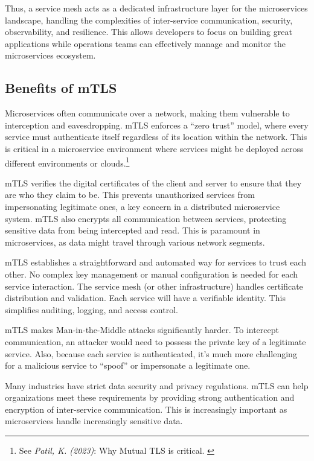 Thus, a service mesh acts as a dedicated infrastructure layer for the
microservices landscape, handling the complexities of inter-service
communication, security, observability, and resilience. This allows
developers to focus on building great applications while operations
teams can effectively manage and monitor the microservices ecosystem.

\subsection{Benefits of mTLS}

Microservices often communicate over a network, making them vulnerable
to interception and eavesdropping. mTLS enforces a ``zero trust'' model,
where every service must authenticate itself regardless of its location
within the network. This is critical in a microservice environment where
services might be deployed across different environments or clouds.\footnote{See \textit{Patil, K. (2023)}: Why Mutual TLS is critical. \cite{whyCritical}}

mTLS verifies the digital certificates of the client and server to
ensure that they are who they claim to be. This prevents unauthorized
services from impersonating legitimate ones, a key concern in a
distributed microservice system. mTLS also encrypts all communication
between services, protecting sensitive data from being intercepted and
read. This is paramount in microservices, as data might travel through
various network segments.

mTLS establishes a straightforward and automated way for services to
trust each other. No complex key management or manual configuration is
needed for each service interaction. The service mesh (or other
infrastructure) handles certificate distribution and validation. Each
service will have a verifiable identity. This simplifies auditing,
logging, and access control.

mTLS makes Man-in-the-Middle attacks significantly harder. To intercept
communication, an attacker would need to possess the private key of a
legitimate service. Also, because each service is authenticated, it's
much more challenging for a malicious service to ``spoof'' or impersonate a
legitimate one.

Many industries have strict data security and privacy regulations. mTLS
can help organizations meet these requirements by providing strong
authentication and encryption of inter-service communication. This is
increasingly important as microservices handle increasingly sensitive
data.

